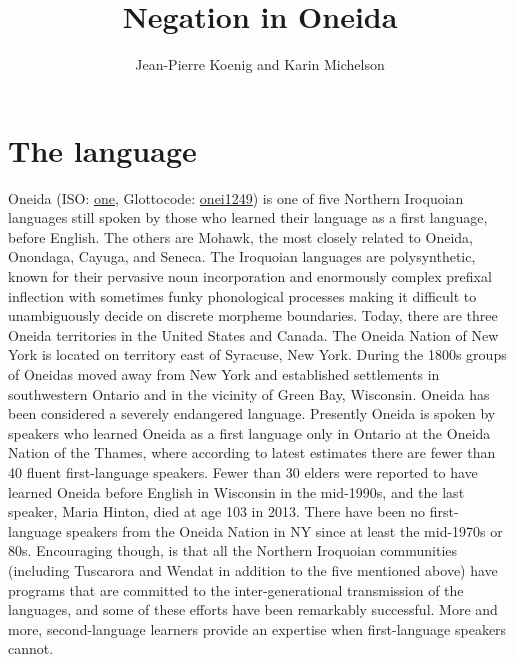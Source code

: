 \documentclass[output=paper,colorlinks,citecolor=brown]{langscibook}
\author{Jean-Pierre Koenig\affiliation{University at Buffalo} and         Karin Michelson\affiliation{University at Buffalo}}
\title{Negation in Oneida}
\begin{document}
\maketitle


\section{The language}
Oneida (ISO: \href{https://iso639-3.sil.org/code/one}{one}, Glottocode: \href{https://glottolog.org/resource/languoid/id/onei1249}{onei1249}) is one of five Northern Iroquoian languages still spoken by those who learned their language as a first language, before English. The others are Mohawk, the most closely related to Oneida, Onon\-daga, Cayuga, and Seneca. The Iroquoian languages are polysynthetic, known for their pervasive noun incorporation and enormously complex prefixal inflection with sometimes funky phonological processes making it difficult to unambiguously decide on discrete morpheme boundaries.  Today, there are three Oneida territories in the United States and Canada. The Oneida Nation of New York is located on territory east of Syracuse, New York. During the 1800s groups of Oneidas moved away from New York and established settlements in southwestern Ontario and in the vicinity of Green Bay, Wisconsin. Oneida has been considered a severely endangered language. Presently Oneida is spoken by speakers who learned Oneida as a first language only in Ontario at the Oneida Nation of the Thames, where according to latest estimates there are fewer than 40 fluent first-language speakers. Fewer than 30 elders were reported to have learned Oneida before English in Wisconsin in the mid-1990s, and the last speaker, Maria Hinton, died at age 103 in 2013. There have been no first-language speakers from the Oneida Nation in NY since at least the mid-1970s or 80s. Encouraging though, is that all the Northern Iroquoian communities (including Tuscarora and Wendat in addition to the five mentioned above) have programs that are committed to the inter-generational transmission of the languages, and some of these efforts have been remarkably successful. More and more, second-language learners provide an expertise when first-language speakers cannot.
\end{document}
